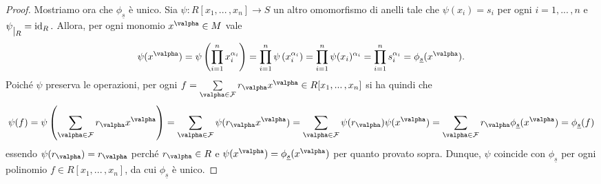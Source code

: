 \begin{proof}
\vspace{2mm}

\noindent Mostriamo ora che $\phi_{\underline{s}}$ è unico. Sia $\psi\colon R[x_1,...\,,x_n]\to S$ un altro omomorfismo di anelli tale che $\psi(x_i)=s_i$ per ogni $i=1,...\,,n$ e $\psi \raisebox{-.5em}{$\vert_{R}$}= \operatorname{id}_R.$ Allora, per ogni monomio $x^{\valpha}\in M$ vale $$\psi(x^{\valpha})=\psi\left(\prod\limits_{i=1}^n x_i^{\alpha_i}\right)=\prod\limits_{i=1}^n \psi\left(x_i^{\alpha_i}\right)=\prod\limits_{i=1}^n \psi(x_i)^{\alpha_i}=\prod\limits_{i=1}^n s_i^{\alpha_i}=\phi_{\underline{s}}(x^{\valpha}).$$ Poiché $\psi$ preserva le operazioni, per ogni $f=\sum\limits_{\valpha\in \mathcal{F}} r_{\valpha}x^{\valpha}\in R[x_1,...\,,x_n]$ si ha quindi che \[ \psi(f)=\psi\left(\sum\limits_{\valpha\in \mathcal{F}} r_{\valpha}x^{\valpha}\right)=\sum\limits_{\valpha\in \mathcal{F}} \psi(r_{\valpha}x^{\valpha})=\sum\limits_{\valpha\in \mathcal{F}} \psi(r_{\valpha})\psi(x^{\valpha})=\sum\limits_{\valpha\in \mathcal{F}} r_{\valpha}\phi_{\underline{s}}(x^{\valpha})=\phi_{\underline{s}}(f)\] essendo $\psi(r_{\valpha})=r_{\valpha}$ perché $r_{\valpha}\in R$ e $\psi(x^{\valpha})=\phi_{\underline{s}}(x^{\valpha})$ per quanto provato sopra. Dunque, $\psi$ coincide con $\phi_{\underline{s}}$ per ogni polinomio $f\in R[x_1,...\,,x_n]$, da cui $\phi_{\underline{s}}$ è unico.\end{proof}

